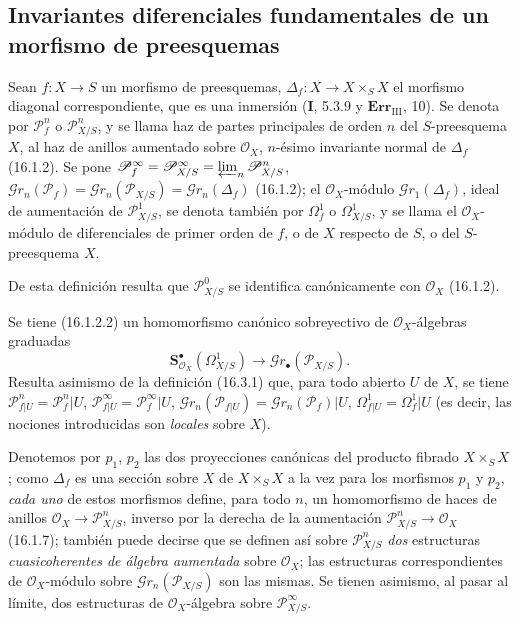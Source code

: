 \subsection{Invariantes diferenciales fundamentales de un morfismo de preesquemas}
\label{IV.16.3}

\begin{definition}[16.3.1]
\label{IV.16.3.1}
Sean $f:X\to S$ un morfismo de preesquemas, $\Delta_f:X\to X\times_S X$
el morfismo diagonal correspondiente, que es una inmersión \textup{(\textbf{I}, 5.3.9} y
\textup{$\mathbf{Err}_{\mathrm{III}}$, 10)}. Se denota por $\mathscr{P}_f^n$ o
$\mathscr{P}_{X/S}^n$, y se llama \textup{haz de partes principales de orden $n$
del $S$-preesquema $X$}, al haz de anillos aumentado sobre $\mathcal{O}_X$, $n$-ésimo
invariante normal de $\Delta_f$ \textup{(16.1.2)}. Se pone
$\mathscr{P}_f^\infty=\mathscr{P}_{X/S}^\infty=
\varprojlim_n\mathscr{P}_{X/S}^n$,
$\mathscr{G}r_n(\mathscr{P}_f)=\mathscr{G}r_n(\mathscr{P}_{X/S})=
\mathscr{G}r_n(\Delta_f)$ \textup{(16.1.2)}; el $\mathcal{O}_X$-módulo
$\mathscr{G}r_1(\Delta_f)$, ideal de aumentación de $\mathscr{P}_{X/S}^1$, se
denota también por $\varOmega_f^1$ o $\varOmega_{X/S}^1$, y se llama el $\mathcal{O}_X$-módulo
de \textup{diferenciales de primer orden} de $f$, o de $X$ respecto de $S$, o del $S$-preesquema $X$.
\end{definition}

De esta definición resulta que $\mathscr{P}_{X/S}^0$ se identifica
canónicamente con $\mathcal{O}_X$ (16.1.2).

Se tiene (16.1.2.2) un homomorfismo canónico sobreyectivo de
$\mathcal{O}_X$-álgebras graduadas
\[
  \mathbf{S}_{\mathcal{O}_X}^{\bullet}(\varOmega_{X/S}^1)
  \longrightarrow\mathscr{G}r_\bullet(\mathscr{P}_{X/S}).
  \tag{16.3.1.1}
  \label{IV.16.3.1.1}
\]
Resulta asimismo de la definición (16.3.1) que, para todo abierto $U$ de $X$, se tiene
$\mathscr{P}_{f|U}^n=\mathscr{P}_f^n|U$,
$\mathscr{P}_{f|U}^\infty=\mathscr{P}_f^\infty|U$,
$\mathscr{G}r_n(\mathscr{P}_{f|U})=\mathscr{G}r_n(\mathscr{P}_f)|U$,
$\varOmega_{f|U}^1=\varOmega_f^1|U$ (es decir, las nociones introducidas son
\emph{locales} sobre $X$).

\begin{env}[16.3.2]
\label{IV.16.3.2}
Denotemos por $p_1$, $p_2$ las dos proyecciones canónicas del producto fibrado $X\times_S X$;
como $\Delta_f$ es una sección sobre $X$ de $X\times_S X$ a la vez para los
morfismos $p_1$ y $p_2$, \emph{cada uno} de estos morfismos define, para todo $n$, un
homomorfismo de haces de anillos $\mathcal{O}_X\to\mathscr{P}_{X/S}^n$,
inverso por la derecha de la aumentación $\mathscr{P}_{X/S}^n\to\mathcal{O}_X$
(16.1.7); también puede decirse que se definen así sobre
$\mathscr{P}_{X/S}^n$ \emph{dos} estructuras \emph{cuasicoherentes de álgebra aumentada} sobre
$\mathcal{O}_X$; las estructuras correspondientes de $\mathcal{O}_X$-módulo sobre
$\mathscr{G}r_n(\mathscr{P}_{X/S})$ son las mismas. Se tienen asimismo, al pasar al
límite, dos estructuras de $\mathcal{O}_X$-álgebra sobre
$\mathscr{P}_{X/S}^\infty$.
\end{env}

